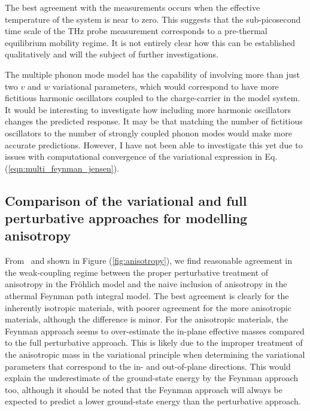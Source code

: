 The best agreement with the measurements occurs when the effective temperature of the system is near to zero. This suggests that the sub-picosecond time scale of the THz probe measurement corresponds to a pre-thermal equilibrium mobility regime. It is not entirely clear how this can be established qualitatively and will the subject of further investigations. 

The multiple phonon mode model has the capability of involving more than just two $v$ and $w$ variational parameters, which would correspond to have more fictitious harmonic oscillators coupled to the charge-carrier in the model system. It would be interesting to investigate how including more harmonic oscillators changes the predicted response. It may be that matching the number of fictitious oscillators to the number of strongly coupled phonon modes would make more accurate predictions. However, I have not been able to investigate this yet due to issues with computational convergence of the variational expression in Eq. (\ref{eqn:multi_feynman_jensen}).

\subsection{Comparison of the variational and full perturbative approaches for modelling anisotropy}

From~\cite{guster_frohlich_2021} and shown in Figure (\ref{fig:anisotropy}), we find reasonable agreement in the weak-coupling regime between the proper perturbative treatment of anisotropy in the Fr\"ohlich model and the naive inclusion of anisotropy in the athermal Feynman path integral model. The best agreement is clearly for the inherently isotropic materials, with poorer agreement for the more anisotropic materials, although the difference is minor. For the anisotropic materials, the Feynman approach seems to over-estimate the in-plane effective masses compared to the full perturbative approach. This is likely due to the improper treatment of the anisotropic mass in the variational principle when determining the variational parameters that correspond to the in- and out-of-plane directions. This would explain the underestimate of the ground-state energy by the Feynman approach too, although it should be noted that the Feynman approach will always be expected to predict a lower ground-state energy than the perturbative approach. 

